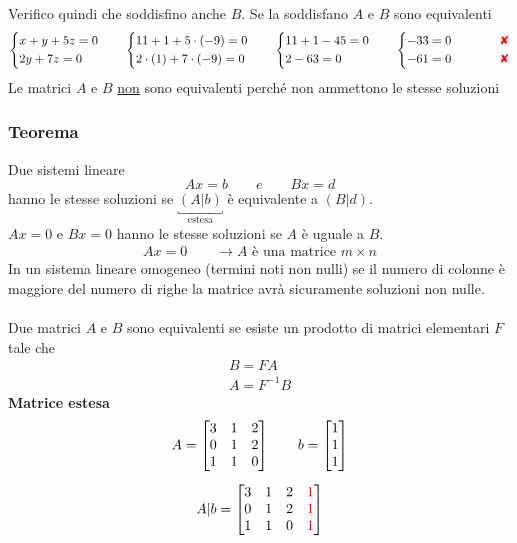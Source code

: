 \documentclass[italian]{article}
\newcommand{\crossmark}{\textcolor{red}{\text{$\qquad$\ding{56}}}}
\begin{document}
Verifico quindi che soddisfino anche $B$. Se la soddisfano $A$ e $B$ sono equivalenti
\begin{gather*}
	\begin{cases*}
		x + y +5z = 0 \\
		2y + 7z = 0
	\end{cases*}
	\qquad
	\begin{cases*}
		11 + 1 + 5\cdot(-9) = 0 \\
		2\cdot(1) + 7\cdot(-9) = 0
	\end{cases*}
	\qquad
	\begin{cases*}
		11 + 1 -45 = 0 \\
		2 -63 = 0
	\end{cases*}
	\qquad
	\begin{cases*}
		-33 = 0  \qquad \crossmark \\
		-61 = 0 \qquad \crossmark
	\end{cases*}
\end{gather*}
Le matrici $A$ e $B$ \underline{non} sono equivalenti perché non ammettono le stesse soluzioni

\pagebreak
\subsubsection{Teorema}
Due sistemi lineare
\[
	Ax = b \qquad e \qquad Bx= d
\]
hanno le stesse soluzioni se $\underbracket{(A | b)}_{\text{estesa}}$ è equivalente a $(B|d)$.\\[2mm] $Ax = 0$ e $Bx=0$ hanno le stesse soluzioni se $A$ è uguale a $B$.
\begin{gather*}
	Ax = 0 \qquad \to \text{$A$ è una matrice $m \times n$}
\end{gather*}
In un sistema lineare omogeneo (termini noti non nulli) se il numero di colonne è maggiore del numero di righe la matrice avrà sicuramente soluzioni non nulle.\\\\
Due matrici $A$ e $B$ sono equivalenti se esiste un prodotto di matrici elementari $F$ tale che
\begin{gather*}
	B = FA \\
	A = F^{-1}B
\end{gather*}
\textbf{Matrice estesa}
\begin{gather*}
	A =
	\begin{bmatrix}
		3 & 1 & 2 \\
		0 & 1 & 2 \\
		1 & 1 & 0
	\end{bmatrix}
	\qquad 
	b =
	\begin{bmatrix}
		1 \\ 1 \\ 1
	\end{bmatrix}
	\\[2mm]
	A|b =
	\begin{bmatrix}
		3 & 1 & 2 & \textcolor{red}{1} \\
		0 & 1 & 2 & \textcolor{red}{1}\\
		1 & 1 & 0 & \textcolor{red}{1}
	\end{bmatrix}
\end{gather*}
\end{document}
